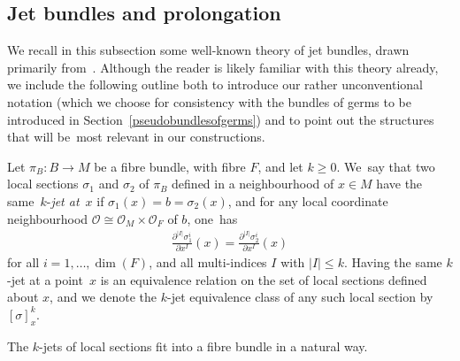 \documentclass[10pt,a4paper]{amsart}
\numberwithin{equation}{section}
\def\OO{{\mathcal{O}}}
\begin{document}
\subsection{Jet bundles and prolongation}

We recall in this subsection some well-known theory of jet bundles, drawn primarily from~\cite{varbi, saunders}. Although the reader is likely familiar with this theory already, we include the following outline both to introduce our rather unconventional notation (which we choose for consistency with the bundles of germs to be introduced in Section~\ref{pseudobundlesofgerms}) and to point out the structures that will be~most relevant in our constructions.

\begin{Definition}
Let $\pi_{B}\colon B\rightarrow M$ be a fibre bundle, with fibre $F$, and let $k\geq0$. We~say that two local sections $\sigma_{1}$ and $\sigma_{2}$ of $\pi_{B}$ defined in a neighbourhood of $x\in M$ have the same~$k$-\textit{jet at}~$x$ if $\sigma_{1}(x) =b= \sigma_{2}(x)$, and for any local coordinate neighbourhood $\OO\cong\OO_{M}\times\OO_{F}$ of $b$, one~has
\begin{gather*}
\frac{\partial^{|I|}\sigma^{i}_{1}}{\partial x^{I}}(x) = \frac{\partial^{|I|}\sigma^{i}_{2}}{\partial x^{I}}(x)
\end{gather*}
for all $i = 1,\dots,\dim(F)$, and all multi-indices $I$ with $|I|\leq k$. Having the same $k$-jet at a point~$x$ is an equivalence relation on the set of local sections defined about $x$, and we denote the $k$-jet equivalence class of any such local section by $[\sigma]^{k}_{x}$.
\end{Definition}

The $k$-jets of local sections fit into a fibre bundle in a natural way.
\end{document}
